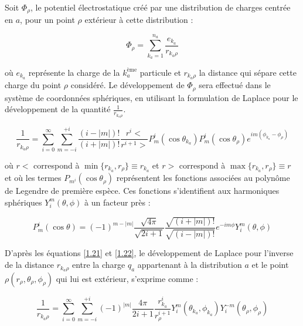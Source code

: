 \documentclass[12pt,a4paper]{book}
\begin{document}
	Soit $\Phi_{\rho}$, le potentiel électrostatique créé par une distribution de charges centrée en $a$, pour un point $\rho$ extérieur à cette distribution : 
	
	\begin{equation}
	\Phi_{\rho} = \sum_{k_{a}=1}^{n_{a}} \frac{e_{k_{a}}}{r_{k_{a}\rho}} \label{1.20}
	\end{equation}
	
	\noindent où $e_{k_{a}}$ représente la charge de la $k_{a}^{\text{ème}}$ particule et $r_{k_{a}\rho}$ la distance qui sépare cette charge du point $\rho$ considéré. Le développement de $\Phi_{\rho}$ sera effectué dans le système de coordonnées sphériques, en utilisant la formulation de Laplace pour le développement de la quantité $\frac{1}{r_{k_{a}\rho}}$.
	
	\begin{equation}
	\frac{1}{r_{k_{a}\rho}} = \sum_{i=0}^{\infty} \sum_{m=-i}^{+i} \frac{(i-|m|)!}{(i+ |m|)!} \frac{r^{i}<}{r^{i+1}>} P_{m}^{i} (\cos\theta_{k_{a}}) P^{i}_{m}(\cos\theta_{\rho})e^{im(\phi_{k_{a}}- \phi_{\rho})} \label{1.21}
	\end{equation}
	
	où $r <$ correspond à $\min \{r_{k_{a}}, r_{\rho}\} \equiv r_{k_{a}}$ et
	$r >$ correspond à $\max \{r_{k_{a}}, r_{\rho}\} \equiv r$
	et où les termes $P_{m^{i}} (\cos\theta_{\rho})$ représentent les fonctions associées au polynôme de Legendre de première espèce. Ces fonctions s'identifient aux harmoniques sphériques $Y_{i}^{m}(\theta,\phi)$ à un facteur près : 
	
	\begin{equation}
	P_{m}^{i}(\cos\theta) = (-1)^{m-|m|} \frac{\sqrt{4\pi}}{\sqrt{2i+ 1}} \frac{\sqrt{(i+ |m|)!}}{\sqrt{(i-|m|)!}} e^{-im\phi} Y_{i}^{m}(\theta,\phi) \label{1.22}
	\end{equation}
	
	D'après les équations \ref{1.21} et \ref{1.22}, le développement de Laplace pour l'inverse de la distance $r_{k_{a}\rho}$ entre la charge $q_{a}$ appartenant à la distribution $a$ et le point $\rho(r_{\rho}, \theta_{\rho}, \phi_{\rho})$ qui lui est extérieur, s'exprime comme : 
	
	\begin{equation}
	\frac{1}{r_{k_{a}\rho}} = \sum_{i=0}^{\infty} \sum_{m=-i}^{+i} (-1)^{|m|} \frac{4\pi}{2i +1} \frac{r_{k_{a}}^{i}}{r_{\rho}^{i+1}} Y^{m}_{i} (\theta_{k_{a}}, \phi_{k_{a}}) Y_{i}^{-m} (\theta_{\rho},\phi_{\rho})  \label{1.23}
	\end{equation}
	
\end{document}
